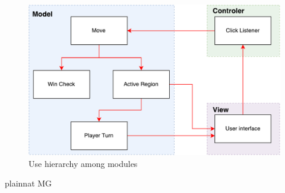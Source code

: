 \documentclass[12pt, titlepage]{article}
\begin{document}
\begin{figure}[H]
\centering
\includegraphics[width=1\textwidth]{UseHierarchy_Diagram.pdf}
\caption{Use hierarchy among modules}
\label{FigUH}
\end{figure}

 {plainnat}
 {MG}
\end{document}
